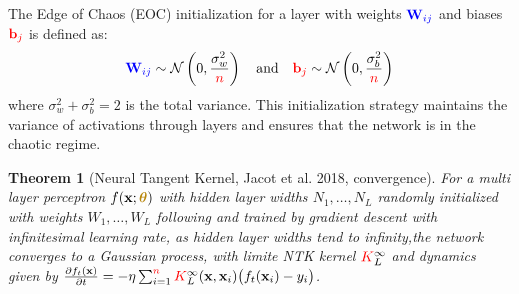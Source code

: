 \documentclass[a4paper]{article}
\theoremstyle{plain}
\newtheorem{theorem}{Theorem}[section]
\theoremstyle{definition}
\theoremstyle{remark}
\begin{document}
\begin{tcolorbox}[colback=yellow!10,colframe=red!60!black,title={\textbf{Definition : Edge of Chaos}},enhanced,drop shadow]
    The Edge of Chaos (EOC) initialization for a layer with weights $\textcolor{blue}{\mathbf{W}_{ij}}$ and biases $\textcolor{red}{\mathbf{b}_j}$ is defined as:
    \begin{equation}
    \textcolor{blue}{\mathbf{W}_{ij}} \sim \mathcal{N}\left(0, \frac{\sigma_w^2}{\textcolor{red}{n}}\right) \quad \text{and} \quad \textcolor{red}{\mathbf{b}_j} \sim \mathcal{N}\left(0, \frac{\sigma_b^2}{\textcolor{red}{n}}\right)
    \end{equation}
    where $\sigma_w^2+\sigma_b^2=2$ is the total variance.
    This initialization strategy maintains the variance of activations through layers and ensures that the network is in the chaotic regime.
\end{tcolorbox}



\begin{theorem}[Neural Tangent Kernel, Jacot et al. 2018, convergence]
For a multi layer perceptron $f(\mathbf{x};\boldsymbol{\textcolor{darkyellow}{\theta}})$ with hidden layer widths $N_1, \ldots, N_L$ randomly initialized with weights $W_1, \ldots, W_L$  following and trained by gradient descent with infinitesimal learning rate, 
as hidden layer widths tend to infinity,the network converges to a Gaussian process, with limite NTK kernel $\textcolor{red}{K}_L^{\infty}$ and dynamics given by $\frac{\partial f_t(\mathbf{x})}{\partial t}
    = -\eta \sum_{i=1}^{\textcolor{red}{n}} \textcolor{red}{K}_L^{\infty}(\mathbf{x},\mathbf{x}_i)\bigl(f_t(\mathbf{x}_i) - y_i\bigr)$.

\end{theorem}
\end{document}
